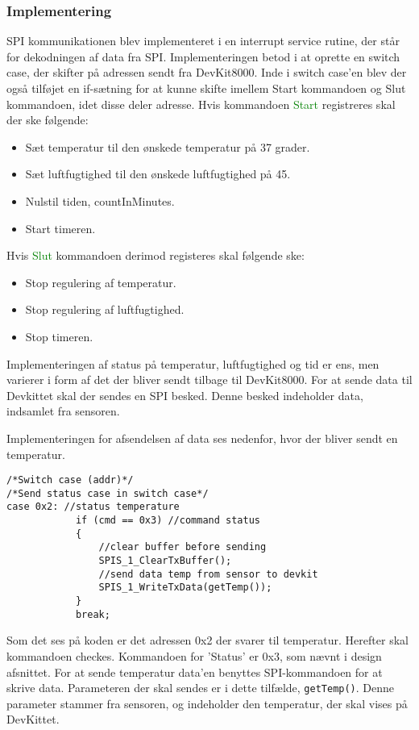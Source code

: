 \subsubsection{Implementering}

SPI kommunikationen blev implementeret i en interrupt service rutine, der står for dekodningen af data fra SPI.
Implementeringen betod i at oprette en switch case, der skifter på adressen sendt fra DevKit8000.
Inde i switch case'en blev der også tilføjet en if-sætning for at kunne skifte imellem Start kommandoen og Slut kommandoen, idet disse deler adresse.
\clearpage
Hvis kommandoen \textcolor{green}{Start} registreres skal der ske følgende:
\begin{itemize}
  \item Sæt temperatur til den ønskede temperatur på 37 grader.
  \item Sæt luftfugtighed til den ønskede luftfugtighed på 45.
  \item Nulstil tiden, countInMinutes.
  \item Start timeren.
\end{itemize}

Hvis \textcolor{green}{Slut} kommandoen derimod registeres skal følgende ske:
\begin{itemize}
  \item Stop regulering af temperatur.
  \item Stop regulering af luftfugtighed.
  \item Stop timeren.
\end{itemize}

Implementeringen af status på temperatur, luftfugtighed og tid er ens, men varierer
i form af det der bliver sendt tilbage til DevKit8000. 
For at sende data til Devkittet skal der sendes en SPI besked. Denne besked indeholder data, indsamlet fra sensoren. 

Implementeringen for afsendelsen af data ses nedenfor, hvor der bliver sendt en temperatur.
\begin{lstlisting}
/*Switch case (addr)*/
/*Send status case in switch case*/
case 0x2: //status temperature
			if (cmd == 0x3) //command status
            {   
                //clear buffer before sending
                SPIS_1_ClearTxBuffer(); 
                //send data temp from sensor to devkit
                SPIS_1_WriteTxData(getTemp());
            }
			break;
\end{lstlisting}

Som det ses på koden er det adressen 0x2 der svarer til temperatur. Herefter skal kommandoen checkes. Kommandoen for 'Status' er 0x3, som nævnt i design afsnittet.
For at sende temperatur data'en benyttes SPI-kommandoen for at skrive data. Parameteren der skal sendes er i dette tilfælde, \texttt{getTemp()}. Denne parameter stammer fra sensoren, og indeholder den temperatur, der skal vises på DevKittet.

